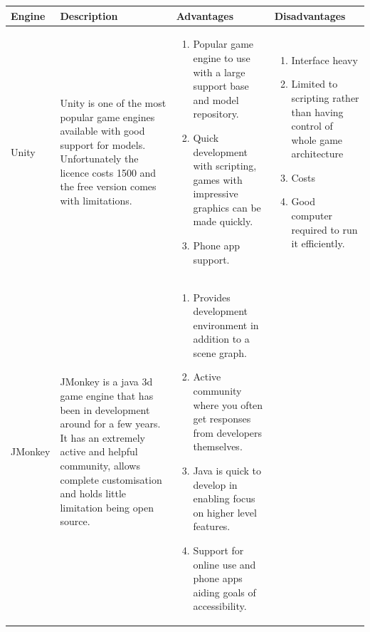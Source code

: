 \documentclass[11pt]{report}
\begin{document}
\begin{table}[H]
    \begin{tabular}{| p{2cm} | p{4cm} | p{6cm} | p{5cm}| }
    \hline
    Engine & Description & Advantages & Disadvantages \\ \hline
    Unity & Unity is one of the most popular game engines available with good support for models. Unfortunately the licence costs 1500 and the free version comes with limitations. & \begin{minipage}{6cm}
    \vskip 4pt
    \begin{enumerate}
   \item Popular game engine to use with a large support base and model repository. 
   \item Quick development with scripting, games with impressive graphics can be made quickly. 
   \item Phone app support.
   \end{enumerate}
   \vskip 4pt
 \end{minipage}   & 
 \begin{minipage}{5cm}
    \vskip 4pt
    \begin{enumerate}
   \item Interface heavy 
   \item Limited to scripting rather than having control of whole game architecture
   \item Costs 
   \item Good computer required to run it efficiently.
   \end{enumerate}
   \vskip 4pt
 \end{minipage}
	\\ \hline
	JMonkey & JMonkey is a java 3d game engine that has been in development around for a few years. It has an extremely active and helpful community, allows complete customisation and holds little limitation being open source.  &
	 \begin{minipage}{6cm}
    \vskip 4pt
    \begin{enumerate}
   \item Provides development environment in addition to a scene graph.
   \item Active community where you often get responses from developers themselves.
   \item Java is quick to develop in enabling focus on higher level features.
   \item Support for online use and phone apps aiding goals of accessibility.  
   \end{enumerate}

\end{minipage}
\end{tabular}
\end{table}
\end{document}
